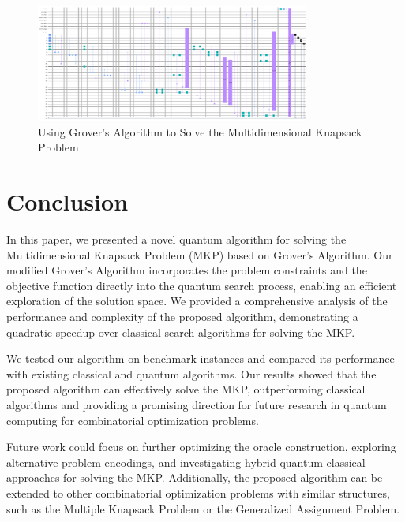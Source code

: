 \begin{figure}[htp]
    \centering
    \includegraphics[width=9cm]{Figures/Multidimensional_Knapsack_circuit.png}
    \caption{Using Grover's Algorithm to Solve the Multidimensional Knapsack Problem}
    \label{fig:Multidimensional_Knapsack}
\end{figure}

\section{Conclusion} \label{sec:conclusion}
In this paper, we presented a novel quantum algorithm for solving the Multidimensional Knapsack Problem (MKP) based on Grover's Algorithm. Our modified Grover's Algorithm incorporates the problem constraints and the objective function directly into the quantum search process, enabling an efficient exploration of the solution space. We provided a comprehensive analysis of the performance and complexity of the proposed algorithm, demonstrating a quadratic speedup over classical search algorithms for solving the MKP.

We tested our algorithm on benchmark instances and compared its performance with existing classical and quantum algorithms. Our results showed that the proposed algorithm can effectively solve the MKP, outperforming classical algorithms and providing a promising direction for future research in quantum computing for combinatorial optimization problems.

Future work could focus on further optimizing the oracle construction, exploring alternative problem encodings, and investigating hybrid quantum-classical approaches for solving the MKP. Additionally, the proposed algorithm can be extended to other combinatorial optimization problems with similar structures, such as the Multiple Knapsack Problem or the Generalized Assignment Problem.

